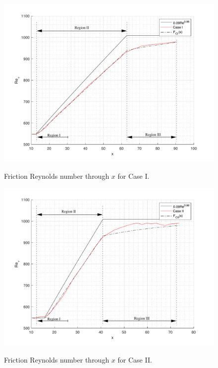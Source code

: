 \documentclass[twocolumn,10pt]{asme2e}
\begin{document}
\begin{figure}[t]
\centering
\scalebox{0.4}
{\includegraphics{convolution_CI.pdf}}
\caption{Friction Reynolds number through \(x\) for Case I.}
\label{fig:convolution_CI}
\end{figure}

\begin{figure}[t]
\centering
\scalebox{0.4}
{\includegraphics{convolution_CII.pdf}}
\caption{Friction Reynolds number through \(x\) for Case II.}
\label{fig:convolution_CII}
\end{figure}
\end{document}
